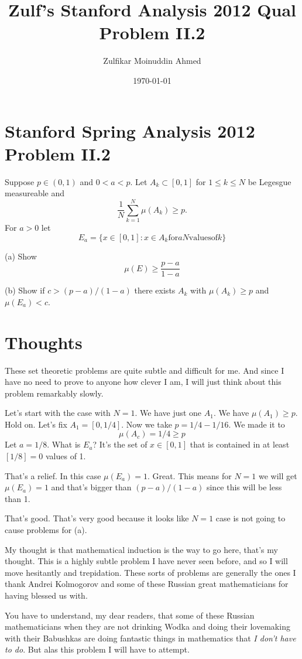 \documentclass{amsart}
\title{Zulf's Stanford Analysis 2012 Qual Problem II.2}
\author{Zulfikar Moinuddin Ahmed}
\date{\today}
\begin{document}
\maketitle

\section{Stanford Spring Analysis 2012 Problem II.2}

Suppose $p \in (0,1)$ and $0 < a < p$.  Let $A_k \subset [0,1]$ for $1\le k \le N$ be Legesgue measureable and 
\[
\frac{1}{N}\sum_{k=1}^N \mu(A_k) \ge p.
\]
For $a >0$ let 
\[
E_a = \{ x \in [0,1]: x\in A_k \mathrm{ for } aN \mathrm{ values of } k \}
\]

(a)  Show 
\[
\mu(E) \ge \frac{p-a}{1-a}
\]

(b) Show if $c > (p-a)/(1-a)$ there exists $A_k$ with $\mu(A_k)\ge p$ and $\mu(E_a) < c$.

\section{Thoughts}

These set theoretic problems are quite subtle and difficult for me.  And since I have no need to prove to anyone how clever I am, I will just think about this problem remarkably slowly.

Let's start with the case with $N=1$.  We have just one $A_1$.  We have $\mu(A_1)\ge p$.  Hold on.  Let's fix $A_1 = [0,1/4]$.  Now we take $p= 1/4-1/16$.  We made it to
\[
\mu(A_c) = 1/4 \ge p
\]
Let $a=1/8$.  What is $E_a$?  It's the set of $x \in [0,1]$ that is contained in at least $[1/8] =0$ values of 1.  

That's a relief.  In this case $\mu(E_a)=1$.  Great.  This means for $N=1$ we will get $\mu(E_a)=1$ and that's bigger than $(p-a)/(1-a)$ since this will be less than 1.

That's good.  That's very good because it looks like $N=1$ case is not going to cause problems for (a).

My thought is that mathematical induction is the way to go here, that's my thought.  This is a highly subtle problem I have never seen before, and so I will move hesitantly and trepidation.  These sorts of problems are generally the ones I thank Andrei Kolmogorov and some of these Russian great mathematicians for having blessed us with.  

You have to understand, my dear readers, that some of these Russian mathematicians when they are not drinking Wodka and doing their lovemaking with their Babushkas are doing fantastic things in mathematics that {\em I don't have to do}.  But alas this problem I will have to attempt.
\end{document}
